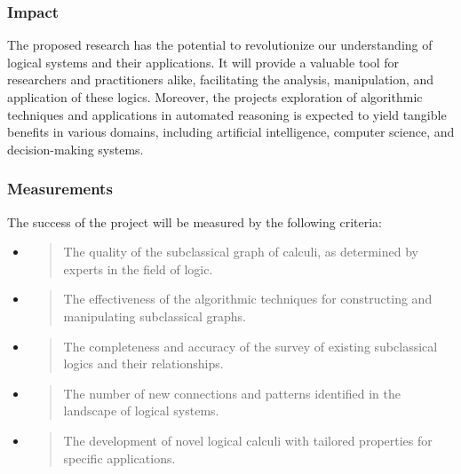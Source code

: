 \hypertarget{impact-2}{%
\subsubsection{Impact}\label{impact-2}}

The proposed research has the potential to revolutionize our
understanding of logical systems and their applications. It will provide
a valuable tool for researchers and practitioners alike, facilitating
the analysis, manipulation, and application of these logics. Moreover,
the project\textquotesingle s exploration of algorithmic techniques and
applications in automated reasoning is expected to yield tangible
benefits in various domains, including artificial intelligence, computer
science, and decision-making systems.

\hypertarget{measurements}{%
\subsubsection{Measurements}\label{measurements}}

The success of the project will be measured by the following criteria:

\begin{itemize}
\item
  \begin{quote}
  The quality of the subclassical graph of calculi, as determined by
  experts in the field of logic.
  \end{quote}
\item
  \begin{quote}
  The effectiveness of the algorithmic techniques for constructing and
  manipulating subclassical graphs.
  \end{quote}
\item
  \begin{quote}
  The completeness and accuracy of the survey of existing subclassical
  logics and their relationships.
  \end{quote}
\item
  \begin{quote}
  The number of new connections and patterns identified in the landscape
  of logical systems.
  \end{quote}
\item
  \begin{quote}
  The development of novel logical calculi with tailored properties for
  specific applications.
  \end{quote}
\end{itemize}

